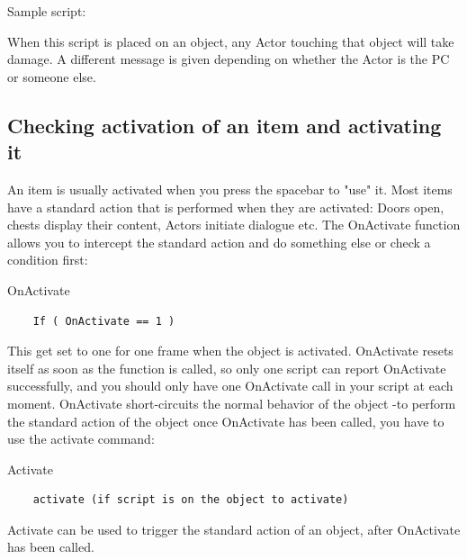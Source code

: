 Sample script:

When this script is placed on an object, any Actor touching that object
will take damage. A different message is given depending on whether the
Actor is the PC or someone else.



\hypertarget{section-3}{%
\subsection{}\label{section-3}}

\hypertarget{section-4}{%
\subsection{}\label{section-4}}

\hypertarget{checking-activation-of-an-item-and-activating-it}{%
\subsection{Checking activation of an item and activating
it}\label{checking-activation-of-an-item-and-activating-it}}

An item is usually activated when you press the spacebar to "use" it.
Most items have a standard action that is performed when they are
activated: Doors open, chests display their content, Actors initiate
dialogue etc. The OnActivate function allows you to intercept the
standard action and do something else or check a condition first:

OnActivate
\begin{lstlisting}
	If ( OnActivate == 1 )
\end{lstlisting}

This get set to one for one frame when the object is activated.
OnActivate resets itself as soon as the function is called, so only one
script can report OnActivate successfully, and you should only have one
OnActivate call in your script at each moment. OnActivate short-circuits
the normal behavior of the object -to perform the standard action of the
object once OnActivate has been called, you have to use the activate
command:

Activate

\begin{lstlisting}
	activate (if script is on the object to activate)
\end{lstlisting}

Activate can be used to trigger the standard action of an object, after
OnActivate has been called.


